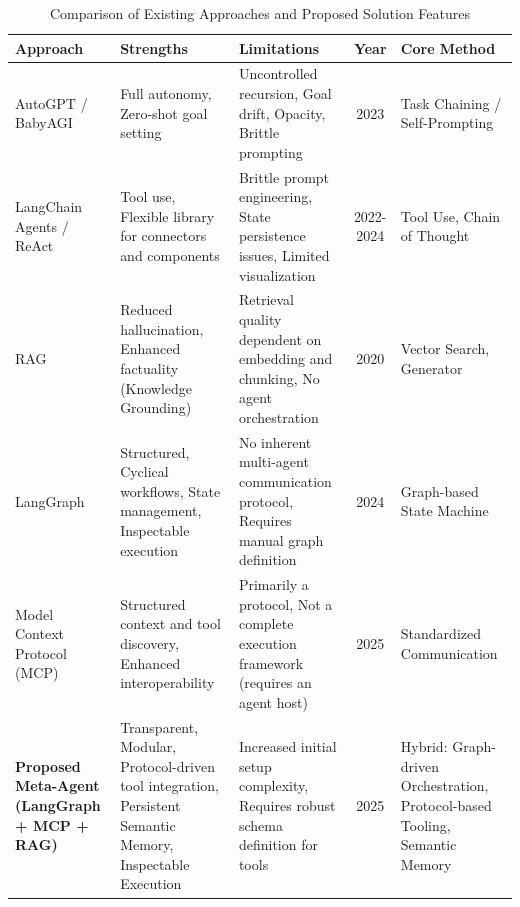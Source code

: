 \documentclass[lettersize,journal]{IEEEtran}
\begin{document}
\begin{table}[htbp]
\centering
\caption{Comparison of Existing Approaches and Proposed Solution Features}
\label{tab:comparison}
\begin{tabular}{p{3cm} p{3.5cm} p{3.5cm} c p{3cm}}
\toprule
\textbf{Approach} & \textbf{Strengths} & \textbf{Limitations} & \textbf{Year} & \textbf{Core Method} \\
\midrule
AutoGPT / BabyAGI & Full autonomy, Zero-shot goal setting & Uncontrolled recursion, Goal drift, Opacity, Brittle prompting & 2023 & Task Chaining / Self-Prompting \\
\midrule
LangChain Agents / ReAct & Tool use, Flexible library for connectors and components & Brittle prompt engineering, State persistence issues, Limited visualization & 2022-2024 & Tool Use, Chain of Thought \\
\midrule
RAG \cite{lewis2020retrieval, tural2024retrieval} & Reduced hallucination, Enhanced factuality (Knowledge Grounding) & Retrieval quality dependent on embedding and chunking, No agent orchestration & 2020 & Vector Search, Generator \\
\midrule
LangGraph \cite{wang2024agent} & Structured, Cyclical workflows, State management, Inspectable execution & No inherent multi-agent communication protocol, Requires manual graph definition & 2024 & Graph-based State Machine \\
\midrule
Model Context Protocol (MCP) \cite{krishnan2025advancing, ahn2025agentic} & Structured context and tool discovery, Enhanced interoperability & Primarily a protocol, Not a complete execution framework (requires an agent host) & 2025 & Standardized Communication \\
\midrule
\textbf{Proposed Meta-Agent (LangGraph + MCP + RAG)} & Transparent, Modular, Protocol-driven tool integration, Persistent Semantic Memory, Inspectable Execution & Increased initial setup complexity, Requires robust schema definition for tools & 2025 & Hybrid: Graph-driven Orchestration, Protocol-based Tooling, Semantic Memory \\
\bottomrule
\end{tabular}
\end{table}
\end{document}
